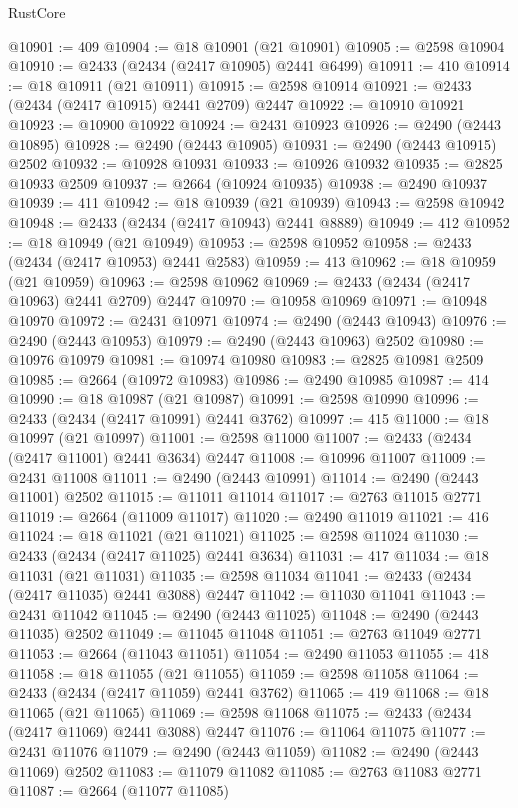 \begin{lexlean}{RustCore}
\begin{coremodule}
@10901 := 409
@10904 := @18 @10901 (@21 @10901)
@10905 := @2598 @10904
@10910 := @2433 (@2434 (@2417 @10905) @2441 @6499)
@10911 := 410
@10914 := @18 @10911 (@21 @10911)
@10915 := @2598 @10914
@10921 := @2433 (@2434 (@2417 @10915) @2441 @2709) @2447
@10922 := @10910 @10921
@10923 := @10900 @10922
@10924 := @2431 @10923
@10926 := @2490 (@2443 @10895)
@10928 := @2490 (@2443 @10905)
@10931 := @2490 (@2443 @10915) @2502
@10932 := @10928 @10931
@10933 := @10926 @10932
@10935 := @2825 @10933 @2509
@10937 := @2664 (@10924 @10935)
@10938 := @2490 @10937
@10939 := 411
@10942 := @18 @10939 (@21 @10939)
@10943 := @2598 @10942
@10948 := @2433 (@2434 (@2417 @10943) @2441 @8889)
@10949 := 412
@10952 := @18 @10949 (@21 @10949)
@10953 := @2598 @10952
@10958 := @2433 (@2434 (@2417 @10953) @2441 @2583)
@10959 := 413
@10962 := @18 @10959 (@21 @10959)
@10963 := @2598 @10962
@10969 := @2433 (@2434 (@2417 @10963) @2441 @2709) @2447
@10970 := @10958 @10969
@10971 := @10948 @10970
@10972 := @2431 @10971
@10974 := @2490 (@2443 @10943)
@10976 := @2490 (@2443 @10953)
@10979 := @2490 (@2443 @10963) @2502
@10980 := @10976 @10979
@10981 := @10974 @10980
@10983 := @2825 @10981 @2509
@10985 := @2664 (@10972 @10983)
@10986 := @2490 @10985
@10987 := 414
@10990 := @18 @10987 (@21 @10987)
@10991 := @2598 @10990
@10996 := @2433 (@2434 (@2417 @10991) @2441 @3762)
@10997 := 415
@11000 := @18 @10997 (@21 @10997)
@11001 := @2598 @11000
@11007 := @2433 (@2434 (@2417 @11001) @2441 @3634) @2447
@11008 := @10996 @11007
@11009 := @2431 @11008
@11011 := @2490 (@2443 @10991)
@11014 := @2490 (@2443 @11001) @2502
@11015 := @11011 @11014
@11017 := @2763 @11015 @2771
@11019 := @2664 (@11009 @11017)
@11020 := @2490 @11019
@11021 := 416
@11024 := @18 @11021 (@21 @11021)
@11025 := @2598 @11024
@11030 := @2433 (@2434 (@2417 @11025) @2441 @3634)
@11031 := 417
@11034 := @18 @11031 (@21 @11031)
@11035 := @2598 @11034
@11041 := @2433 (@2434 (@2417 @11035) @2441 @3088) @2447
@11042 := @11030 @11041
@11043 := @2431 @11042
@11045 := @2490 (@2443 @11025)
@11048 := @2490 (@2443 @11035) @2502
@11049 := @11045 @11048
@11051 := @2763 @11049 @2771
@11053 := @2664 (@11043 @11051)
@11054 := @2490 @11053
@11055 := 418
@11058 := @18 @11055 (@21 @11055)
@11059 := @2598 @11058
@11064 := @2433 (@2434 (@2417 @11059) @2441 @3762)
@11065 := 419
@11068 := @18 @11065 (@21 @11065)
@11069 := @2598 @11068
@11075 := @2433 (@2434 (@2417 @11069) @2441 @3088) @2447
@11076 := @11064 @11075
@11077 := @2431 @11076
@11079 := @2490 (@2443 @11059)
@11082 := @2490 (@2443 @11069) @2502
@11083 := @11079 @11082
@11085 := @2763 @11083 @2771
@11087 := @2664 (@11077 @11085)

\end{coremodule}
\end{lexlean}
